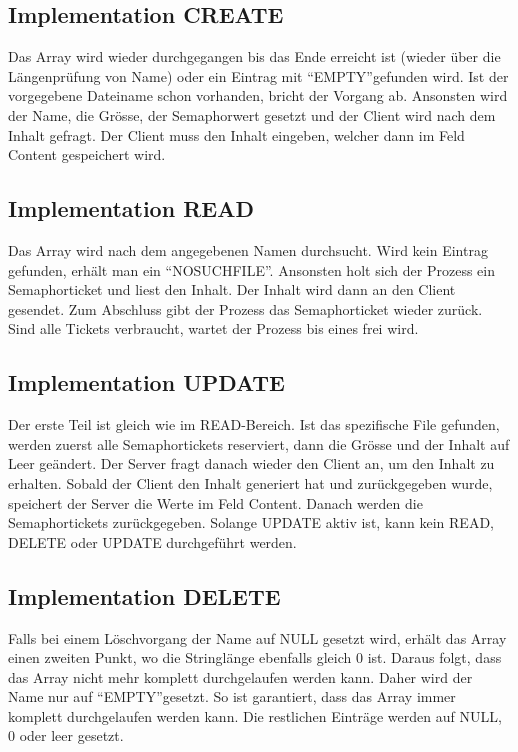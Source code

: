 \documentclass[12pt,a4paper,ngerman]{report}
\begin{document}
\subsection{Implementation CREATE}
Das Array wird wieder durchgegangen bis das Ende erreicht ist (wieder über die Längenprüfung von Name) oder ein Eintrag mit \textquotedblleft EMPTY\textquotedblright gefunden wird. Ist der vorgegebene Dateiname schon vorhanden, bricht der Vorgang ab. Ansonsten wird der Name, die Grösse, der Semaphorwert gesetzt und der Client wird nach dem Inhalt gefragt. Der Client muss den Inhalt eingeben, welcher dann im Feld Content gespeichert wird.
\subsection{Implementation READ}
Das Array wird nach dem angegebenen Namen durchsucht. Wird kein Eintrag gefunden, erhält man ein \textquotedblleft NOSUCHFILE\textquotedblright . Ansonsten holt sich der Prozess ein Semaphorticket und liest den Inhalt. Der Inhalt wird dann an den Client gesendet. Zum Abschluss gibt der Prozess das Semaphorticket wieder zurück. Sind alle Tickets verbraucht, wartet der Prozess bis eines frei wird.
\subsection{Implementation UPDATE}
Der erste Teil ist gleich wie im READ-Bereich. Ist das spezifische File gefunden, werden zuerst alle Semaphortickets reserviert, dann die Grösse und der Inhalt auf Leer geändert. Der Server fragt danach wieder den Client an, um den Inhalt zu erhalten. Sobald der Client den Inhalt generiert hat und zurückgegeben wurde, speichert der Server die Werte im Feld Content. Danach werden die Semaphortickets zurückgegeben. Solange UPDATE aktiv ist, kann kein READ, DELETE oder UPDATE durchgeführt werden.
\subsection{Implementation DELETE}
Falls bei einem Löschvorgang der Name auf NULL gesetzt wird, erhält das Array einen zweiten Punkt, wo die Stringlänge ebenfalls gleich 0 ist. Daraus folgt, dass das Array nicht mehr komplett durchgelaufen werden kann. Daher wird der Name nur auf \textquotedblleft EMPTY\textquotedblright gesetzt. So ist garantiert, dass das Array immer komplett durchgelaufen werden kann. Die restlichen Einträge werden auf NULL, 0 oder leer gesetzt.
\end{document}
